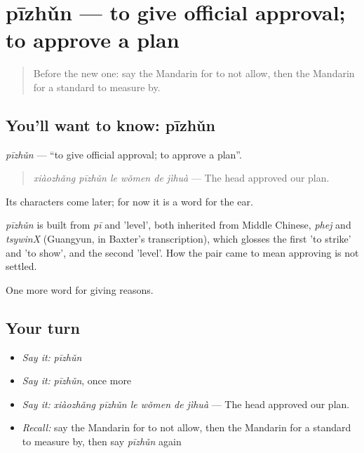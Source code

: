 \section[pīzhǔn]{pīzhǔn — to give official approval; to approve a plan}

\label{lesson:ZH-C364-pizhun}



\begin{quote}
Before the new one: say the Mandarin for to not allow, then the Mandarin for a standard to measure by.
\end{quote}

\subsection*{You'll want to know: pīzhǔn}
\emph{pīzhǔn} — \textquotedblleft{}to give official approval; to approve a plan\textquotedblright{}.

\begin{quote}
\emph{xiàozhǎng pīzhǔn le wǒmen de jìhuà} — The head approved our plan.
\end{quote}

Its characters come later; for now it is a word for the ear.

\begin{cousinweb}
\emph{pīzhǔn} is built from \emph{pī} and  'level', both inherited from Middle Chinese, \emph{phej} and \emph{tsywinX} (Guangyun, in Baxter's transcription), which glosses the first 'to strike' and 'to show', and the second 'level'. How the pair came to mean approving is not settled.
\end{cousinweb}

\begin{grammarlens}[title={What you've built}]
One more word for giving reasons.
\end{grammarlens}

\subsection*{Your turn}
\begin{itemize}
\raggedright
  \item \emph{Say it:} \emph{pīzhǔn}
  \item \emph{Say it:} \emph{pīzhǔn}, once more
  \item \emph{Say it:} \emph{xiàozhǎng pīzhǔn le wǒmen de jìhuà} — The head approved our plan.
  \item \emph{Recall:} say the Mandarin for to not allow, then the Mandarin for a standard to measure by, then say \emph{pīzhǔn} again
\end{itemize}

